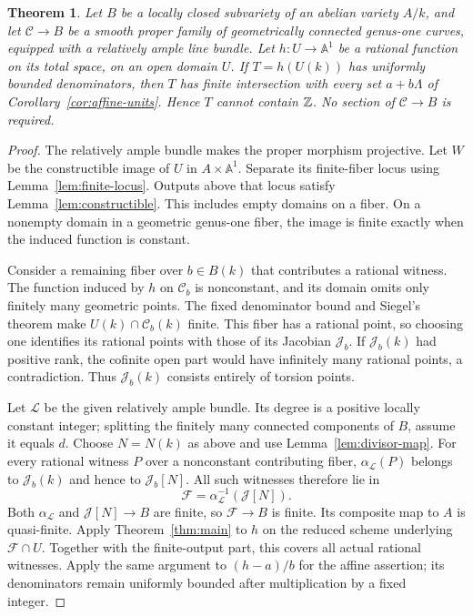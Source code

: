 \documentclass[11pt,a4paper]{article}
\newtheorem{theorem}{Theorem}[section]
\theoremstyle{definition}
\newcommand{\A}{\mathbb A}\newcommand{\PP}{\mathbb P}
\begin{document}
\begin{theorem}\label{thm:elliptic-family}
Let $B$ be a locally closed subvariety of an abelian variety $A/k$,
and let $\mathcal C\to B$ be a smooth proper family of geometrically
connected genus-one curves, equipped with a relatively ample line
bundle. Let $h:U\to\A^1$ be a rational function on its total space,
on an open domain $U$. If $T=h(U(k))$ has uniformly bounded
denominators, then $T$ has finite intersection with every set
$a+b\Lambda$ of Corollary~\ref{cor:affine-units}. Hence $T$
cannot contain $\mathbb Z$. No section of $\mathcal C\to B$ is required.
\end{theorem}
\begin{proof}
The relatively ample bundle makes the proper morphism projective.
Let $W$ be the constructible image of $U$ in $A\times\A^1$.
Separate its finite-fiber locus using
Lemma~\ref{lem:finite-locus}. Outputs above that locus satisfy
Lemma~\ref{lem:constructible}. This includes empty domains on a
fiber. On a nonempty domain in a geometric genus-one fiber, the
image is finite exactly when the induced function is constant.

Consider a remaining fiber over $b\in B(k)$ that contributes a
rational witness. The function induced by $h$ on $\mathcal C_b$
is nonconstant, and its domain omits only finitely many geometric
points. The fixed denominator bound and Siegel's theorem make
$U(k)\cap\mathcal C_b(k)$ finite. This fiber has a rational point,
so choosing one identifies its rational points with those of its
Jacobian $\mathcal J_b$. If $\mathcal J_b(k)$ had positive rank,
the cofinite open part would have infinitely many rational points,
a contradiction. Thus $\mathcal J_b(k)$ consists entirely of
torsion points.

Let $\mathcal L$ be the given relatively ample bundle. Its degree
is a positive locally constant integer; splitting the finitely
many connected components of $B$, assume it equals $d$.
Choose $N=N(k)$ as above and use Lemma~\ref{lem:divisor-map}.
For every rational witness $P$ over a nonconstant contributing fiber,
$\alpha_{\mathcal L}(P)$ belongs to $\mathcal J_b(k)$ and hence
to $\mathcal J_b[N]$. All such witnesses therefore lie in
\[
                 \mathcal F=
                 \alpha_{\mathcal L}^{-1}(\mathcal J[N]).
\]
Both $\alpha_{\mathcal L}$ and $\mathcal J[N]\to B$ are finite,
so $\mathcal F\to B$ is finite. Its composite map to $A$ is
quasi-finite. Apply Theorem~\ref{thm:main} to $h$ on the reduced
scheme underlying $\mathcal F\cap U$. Together with the
finite-output part, this covers all actual rational witnesses.
Apply the same argument to $(h-a)/b$ for the affine assertion;
its denominators remain uniformly bounded after multiplication
by a fixed integer.
\end{proof}
\end{document}
